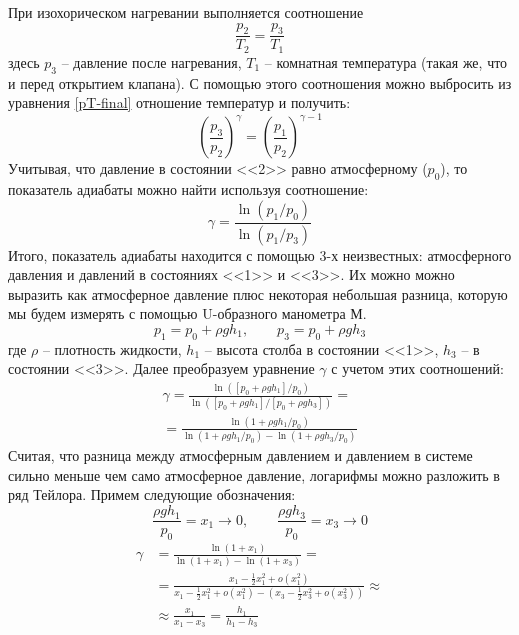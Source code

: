 \documentclass[a4paper,12pt]{report}
\begin{document}
\begin{multicols}{2}
        При изохорическом нагревании выполняется соотношение
        \begin{equation}
            \frac{p_2}{T_2}=\frac{p_3}{T_1}   
        \end{equation}
        здесь $p_3$ -- давление после нагревания, $T_1$ -- комнатная температура (такая же, что и перед открытием клапана). С помощью этого соотношения можно выбросить из уравнения \eqref{pT-final} отношение температур и получить:
        \begin{equation}
            \label{P-final}
            \left(\frac{p_3}{p_2}\right)^\gamma = \left(\frac{p_1}{p_2}\right)^{\gamma-1}
        \end{equation}
        Учитывая, что давление в состоянии <<2>> равно атмосферному ($p_0$), то показатель адиабаты можно найти используя соотношение:
        \begin{equation}
            \label{gamma}
            \gamma = \frac{\ln(p_1/p_0)}{\ln(p_1/p_3)}
        \end{equation}
        Итого, показатель адиабаты находится с помощью 3-х неизвестных: атмосферного давления и давлений в состояниях <<1>> и <<3>>. Их можно можно выразить как атмосферное давление плюс некоторая небольшая разница, которую мы будем измерять с помощью U-образного манометра М.
        \begin{equation*}
            p_1=p_0+\rho gh_1, \qquad p_3=p_0+\rho gh_3
        \end{equation*}
        где $\rho$ -- плотность жидкости, $h_1$ -- высота столба в состоянии <<1>>, $h_3$ -- в состоянии <<3>>. Далее преобразуем уравнение $\gamma$ с учетом этих соотношений:
        \begin{gather*}
            \gamma=\frac{\ln([p_0+\rho gh_1]/p_0)}{\ln([p_0+\rho gh_1]/[p_0+\rho gh_3])}=\\=\frac{\ln(1+\rho gh_1/p_0)}{\ln (1+\rho gh_1/p_0)-\ln(1+\rho gh_3/p_0)} 
        \end{gather*}
        Считая, что разница между атмосферным давлением и давлением в системе сильно меньше чем само атмосферное давление, логарифмы можно разложить в ряд Тейлора. Примем следующие обозначения:
        \begin{equation*}
            \frac{\rho gh_1}{p_0}=x_1\rightarrow0, \qquad \frac{\rho g h_3}{p_0}=x_3\rightarrow 0
        \end{equation*}
        \begin{align}
            \nonumber \gamma&=\frac{\ln(1+x_1)}{\ln(1+x_1)-\ln(1+x_3)}=\\
            \nonumber&=\frac{x_1-\frac{1}{2}x_1^2+o(x_1^2)}{x_1-\frac{1}{2}x_1^2+o(x_1^2)-(x_3-\frac{1}{2}x_3^2+o(x_3^2))}\approx\\ 
            &\approx \frac{x_1}{x_1-x_3}=\frac{h_1}{h_1-h_3} \label{final gamma via h}
        \end{align}
    \newcolumn

\end{multicols}
\end{document}

